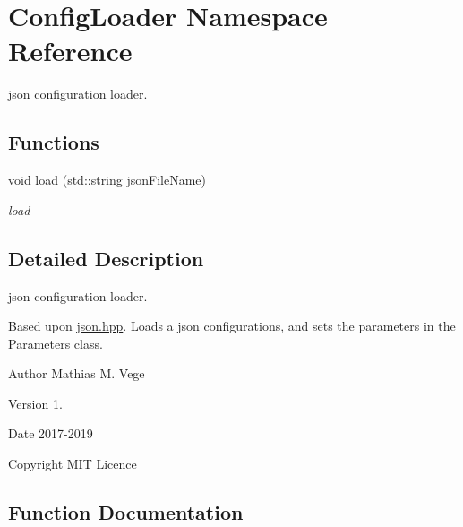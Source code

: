 \hypertarget{namespace_config_loader}{}\section{Config\+Loader Namespace Reference}
\label{namespace_config_loader}


json configuration loader.  


\subsection*{Functions}
\begin{DoxyCompactItemize}
\item 
void \mbox{\hyperlink{namespace_config_loader_a26cf01adba9411ef1fa006d5068d7cc4}{load}} (std\+::string json\+File\+Name)
\begin{DoxyCompactList}\small\item\em load \end{DoxyCompactList}\end{DoxyCompactItemize}


\subsection{Detailed Description}
json configuration loader. 

Based upon \mbox{\hyperlink{json_8hpp}{json.\+hpp}}. Loads a json configurations, and sets the parameters in the \mbox{\hyperlink{class_parameters}{Parameters}} class.

\begin{DoxyAuthor}{Author}
Mathias M. Vege 
\end{DoxyAuthor}
\begin{DoxyVersion}{Version}
1. 
\end{DoxyVersion}
\begin{DoxyDate}{Date}
2017-\/2019 
\end{DoxyDate}
\begin{DoxyCopyright}{Copyright}
M\+IT Licence 
\end{DoxyCopyright}


\subsection{Function Documentation}
\mbox{\label{namespace_config_loader_a26cf01adba9411ef1fa006d5068d7cc4}} 
